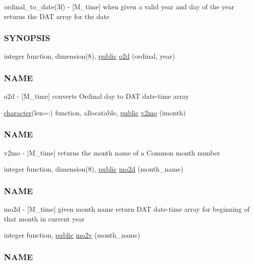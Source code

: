 \begin{DoxyCompactItemize}
\begin{DoxyCompactList}
ordinal\+\_\+to\+\_\+date(3f) -\/ \mbox{[}M\+\_\+time\mbox{]} when given a valid year and day of the year returns the D\+AT array for the date \subsubsection*{S\+Y\+N\+O\+P\+S\+IS}\end{DoxyCompactList}\item 
integer function, dimension(8), \hyperlink{M__stopwatch_83_8txt_a2f74811300c361e53b430611a7d1769f}{public} \hyperlink{namespacem__time_a55e2cb9efc9d4d209ae2864f073d4f19}{o2d} (ordinal, year)
\begin{DoxyCompactList}\small\item\em \subsubsection*{N\+A\+ME}

o2d -\/ \mbox{[}M\+\_\+time\mbox{]} converts Ordinal day to D\+AT date-\/time array \end{DoxyCompactList}\item 
\hyperlink{option__stopwatch_83_8txt_abd4b21fbbd175834027b5224bfe97e66}{character}(len=\+:) function, allocatable, \hyperlink{M__stopwatch_83_8txt_a2f74811300c361e53b430611a7d1769f}{public} \hyperlink{namespacem__time_a6f28cf00e4998bb50bb503f5e4bd3f77}{v2mo} (imonth)
\begin{DoxyCompactList}\small\item\em \subsubsection*{N\+A\+ME}

v2mo -\/ \mbox{[}M\+\_\+time\mbox{]} returns the month name of a Common month number \end{DoxyCompactList}\item 
integer function, dimension(8), \hyperlink{M__stopwatch_83_8txt_a2f74811300c361e53b430611a7d1769f}{public} \hyperlink{namespacem__time_aa5877b420e38077f159482f214b2dc47}{mo2d} (month\+\_\+name)
\begin{DoxyCompactList}\small\item\em \subsubsection*{N\+A\+ME}

mo2d -\/ \mbox{[}M\+\_\+time\mbox{]} given month name return D\+AT date-\/time array for beginning of that month in current year \end{DoxyCompactList}\item 
integer function, \hyperlink{M__stopwatch_83_8txt_a2f74811300c361e53b430611a7d1769f}{public} \hyperlink{namespacem__time_ad7bf0886754757e8961e562f06cf3bb7}{mo2v} (month\+\_\+name)
\begin{DoxyCompactList}\small\item\em \subsubsection*{N\+A\+ME}


\end{DoxyCompactList}
\end{DoxyCompactItemize}

